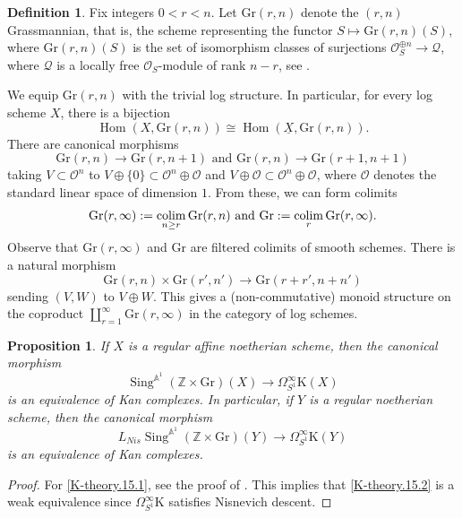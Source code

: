 \documentclass[11pt, a4paper]{amsart}
\newtheorem{prop}[thm]{Proposition}
\theoremstyle{definition}
\newtheorem{df}[thm]{Definition}
\numberwithin{equation}{subsection}
\newcommand{\Z}{\mathbb{Z}}
\newcommand{\A}{\mathbb{A}}
\newcommand{\Sing}{\operatorname{Sing}}              %
\renewcommand{\hom}{\operatorname{Hom}}				 %
\newcommand{\colimit}{\mathop{\rm colim}}
\newcommand{\Gr}{{\mathrm{Gr}}}
\newcommand{\Kth}{\mathrm{K}}
\renewcommand{\ul}{\underline}
\newcommand{\cO}{\mathcal{O}}
\begin{document}
\begin{df} Fix integers $0<r<n$. Let $\Gr(r,n)$\index[notation]{Grrn @ $\Gr(r,n)$} denote the $(r, n)$ Grassmannian, that is, the scheme representing the functor $S\mapsto \Gr(r,n)(S)$, where $\Gr(r,n)(S)$ is the set of isomorphism classes of surjections $\cO^{\oplus n}_S \to \mathcal{Q}$, where $\mathcal{Q}$ is a locally free $\cO_S$-module of rank $n-r$, see \cite[\href{https://stacks.math.columbia.edu/tag/089R}{Tag 089R}]{stacks-project}.

We equip $\Gr(r,n)$ with the trivial log structure.
In particular, for every  log scheme $X$, there is a bijection 
\[
\hom(X,\Gr(r,n))\cong \hom(\ul{X},\Gr(r,n)).
\]
There are canonical morphisms
\[
\Gr(r,n)\to \Gr(r,n+1)
\text{ and }
\Gr(r,n)\to \Gr(r+1,n+1)
\]
taking $V\subset \cO^n$ to $V\oplus \{0\}\subset \cO^n\oplus \cO$ and $V\oplus \cO\subset \cO^n\oplus \cO$, 
where $\cO$ denotes the standard linear space of dimension $1$.
From these, 
we can form colimits
\[
\Gr(r,\infty):=\colimit_{n\geq r}\Gr(r,n)
\text{ and }
\Gr:=\colimit_{r} \Gr(r,\infty).
\]
Observe that $\Gr(r,\infty)$ and $\Gr$ are filtered colimits of smooth schemes.
There is a natural morphism
\[
\Gr(r,n)\times \Gr(r',n')\to \Gr(r+r',n+n')
\]
sending $(V,W)$ to $V\oplus W$.
This gives a (non-commutative) monoid structure on the coproduct $\coprod_{r=1}^\infty \Gr(r,\infty)$
in the category of  log schemes.
\end{df}


\begin{prop}
\label{K-theory.15}
If $X$ is a regular affine noetherian scheme, then the canonical morphism
\begin{equation}
\label{K-theory.15.1}
\Sing^{\A^1}(\Z\times \Gr)(X)
\to
\Omega_{S^1}^\infty \Kth(X)
\end{equation}
is an equivalence of Kan complexes.
In particular, if $Y$ is a regular noetherian scheme, then the canonical morphism
\begin{equation}
\label{K-theory.15.2}
L_{Nis}\Sing^{\A^1}(\Z\times \Gr)(Y)
\to
\Omega_{S^1}^\infty \Kth(Y)
\end{equation}
is an equivalence of Kan complexes.
\end{prop}
\begin{proof}
For \eqref{K-theory.15.1}, see the proof of \cite[Proposition 3.16, p.\ 141]{MV}.
This implies that \eqref{K-theory.15.2} is a 
weak equivalence since $\Omega_{S^1}^\infty \Kth$ satisfies Nisnevich descent.
\end{proof}
\end{document}
